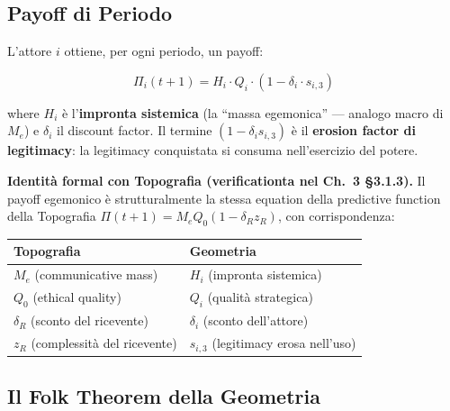 \subsection{Payoff di Periodo}\label{payoff-di-periodo}

L'attore \(i\) ottiene, per ogni periodo, un payoff:

\[
\Pi_i(t+1) = H_i \cdot Q_i \cdot (1 - \delta_i \cdot s_{i,3})
\]

where \(H_i\) è l'\textbf{impronta sistemica} (la ``massa egemonica'' ---
analogo macro di \(M_e\)) e \(\delta_i\) il discount factor. Il
termine \((1 - \delta_i s_{i,3})\) è il \textbf{erosion factor di
legitimacy}: la legitimacy conquistata si consuma nell'esercizio del
potere.

\Proved{} \textbf{Identità formal con Topografia (verificationta nel Ch.~3
\S{}3.1.3).} Il payoff egemonico è strutturalmente la stessa equation
della predictive function della Topografia
\(\Pi(t+1) = M_e Q_0 (1 - \delta_R z_R)\), con corrispondenza:

{\def\LTcaptype{none} %
{\small\begin{longtable}[]{@{}
  >{\raggedright\arraybackslash}p{}
  >{\raggedright\arraybackslash}p{}@{}}
\toprule\noalign{}
\begin{minipage}[b]{\linewidth}\raggedright
Topografia
\end{minipage} & \begin{minipage}[b]{\linewidth}\raggedright
Geometria
\end{minipage} \\
\midrule\noalign{}
\endhead
\bottomrule\noalign{}
\endlastfoot
\(M_e\) (communicative mass) & \(H_i\) (impronta sistemica) \\
\(Q_0\) (ethical quality) & \(Q_i\) (qualità strategica) \\
\(\delta_R\) (sconto del ricevente) & \(\delta_i\) (sconto
dell'attore) \\
\(z_R\) (complessità del ricevente) & \(s_{i,3}\) (legitimacy erosa
nell'uso) \\
\end{longtable}}
}

\subsection{Il Folk Theorem della
Geometria}\label{il-folk-theorem-della-geometria}

